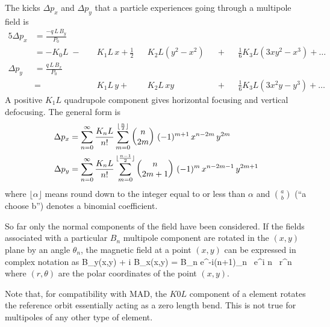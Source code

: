 The kicks $\Delta p_x$ and $\Delta p_y$ that a
particle experiences going through a multipole field is
\begin{alignat}{5}
  \Delta p_x & = \frac{-q \, L \, B_y}{P_0} \label{pqlbp1} \\
             & = -K_0 L \;-\; 
             && K_1 L \, x \plus 
             \frac{1}{2} && K_2 L (y^2 - x^2) && \plus 
             && \frac{1}{6} K_3 L (3x y^2 - x^3) \plus \ldots 
             \nonumber \\
  \Delta p_y & = \frac{q \, L \, B_x}{P_0} \label{pqlbp2} \\
             & =     
             && K_1 L \, y \plus 
             && K_2 L \, xy && \plus 
             && \frac{1}{6} K_3L (3x^2 y - y^3) \plus \ldots \nonumber 
\end{alignat}
A positive $K_1L$ quadrupole component gives
horizontal focusing and vertical defocusing. The general form is
\begin{align}
  \Delta p_x &= \sum_{n = 0}^{\infty} \frac{K_n L}{n!} 
             \sum_{m = 0}^{\lfloor \frac{n}{2} \rfloor}
             \begin{pmatrix} n \cr 2m \end{pmatrix} \,
             (-1)^{m+1} \, x^{n-2m} \, y^{2m} \\
  \Delta p_y &= \sum_{n = 0}^{\infty} \frac{K_n L}{n!} 
             \sum_{m = 0}^{\lfloor \frac{n-1}{2} \rfloor}
             \begin{pmatrix} n \cr 2m+1 \end{pmatrix} \,
             (-1)^{m} \, x^{n-2m-1} \, y^{2m+1}
\end{align}
where $\lfloor\alpha\rfloor$ means round down to the integer equal to or less than $\alpha$ and 
$a \choose b$ (``a choose b'') denotes a binomial coefficient.

So far only the normal components of the field have been
considered. If the fields associated with a particular $B_n$ multipole
component are rotated in the $(x, y)$ plane by an angle $\theta_n$, the
magnetic field at a point $(x,y)$ can be expressed in complex notation
as
\Begineq
  B_y(x,y) + i B_x(x,y) = 
     B_n e^{-i(n+1)\theta_n} \, e^{i n \theta} \, r^n 
  \label{bib1nb}
\Endeq
where $(r, \theta)$ are the polar coordinates of the point $(x, y)$.

Note that, for compatibility with MAD, the $K0L$ component of a  element
rotates the reference orbit essentially acting as a zero length bend. This is not true
for multipoles of any other type of element.

